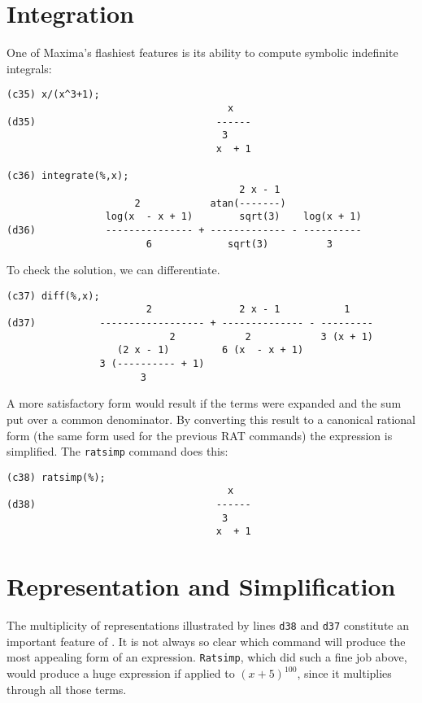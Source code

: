 \section{Integration}

One of Maxima's flashiest features is its ability to compute symbolic indefinite
integrals:
{\footnotesize
\begin{verbatim}
(c35) x/(x^3+1);
                                      x
(d35)                               ------
                                     3
                                    x  + 1

(c36) integrate(%,x);
                                        2 x - 1
                      2            atan(-------)
                 log(x  - x + 1)        sqrt(3)    log(x + 1)
(d36)            --------------- + ------------- - ----------
                        6             sqrt(3)          3
\end{verbatim}}
To check the solution, we can differentiate.
{\small
\begin{verbatim}
(c37) diff(%,x);
                        2               2 x - 1           1
(d37)           ------------------ + -------------- - ---------
                            2            2            3 (x + 1)
                   (2 x - 1)         6 (x  - x + 1)
                3 (---------- + 1)
                       3
\end{verbatim}}
A more satisfactory form would result if the terms were expanded and
the sum put over a common denominator.  By converting this result to
a canonical rational form (the same form used for the previous RAT commands)
the expression is simplified. The {\tt ratsimp}
command does this:
\begin{verbatim}
(c38) ratsimp(%);
                                      x
(d38)                               ------
                                     3
                                    x  + 1
\end{verbatim}

\section{Representation and Simplification}

The multiplicity of representations illustrated by lines {\tt d38} and 
{\tt d37} constitute an important feature of \Max.
It is not always so clear which command will produce the most appealing
form of an expression.  {\tt Ratsimp}, which did such a fine job above,
would produce a huge expression if applied to $ (x + 5)^{100} $, since
it multiplies through all those terms.

